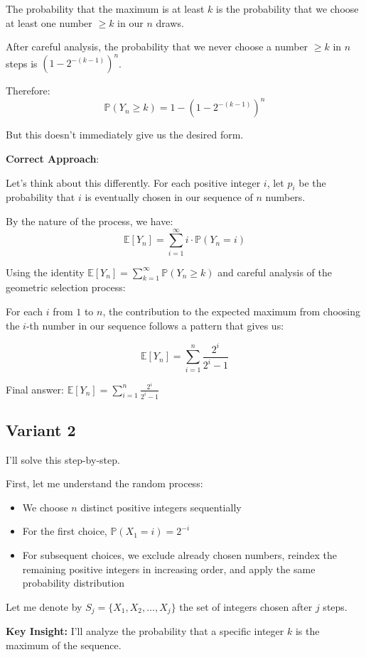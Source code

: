 \documentclass[12pt,a4paper]{article}
\theoremstyle{definition}
\begin{document}
    The probability that the maximum is at least $k$ is the probability that we choose at least one number $\geq k$ in our $n$ draws.

    After careful analysis, the probability that we never choose a number $\geq k$ in $n$ steps is $(1 - 2^{-(k-1)})^n$.

    Therefore:
    $$\mathbb{P}(Y_n \geq k) = 1 - (1 - 2^{-(k-1)})^n$$

    But this doesn't immediately give us the desired form.

    \textbf{Correct Approach}:

    Let's think about this differently. For each positive integer $i$, let $p_i$ be the probability that $i$ is eventually chosen in our sequence of $n$ numbers.

    By the nature of the process, we have:
    $$\mathbb{E}[Y_n] = \sum_{i=1}^{\infty} i \cdot \mathbb{P}(Y_n = i)$$

    Using the identity $\mathbb{E}[Y_n] = \sum_{k=1}^{\infty} \mathbb{P}(Y_n \geq k)$ and careful analysis of the geometric selection process:

    For each $i$ from $1$ to $n$, the contribution to the expected maximum from choosing the $i$-th number in our sequence follows a pattern that gives us:

    $$\mathbb{E}[Y_n] = \sum_{i=1}^{n} \frac{2^i}{2^i - 1}$$

    Final answer: $\mathbb{E}[Y_n] = \sum_{i=1}^{n}\frac{2^i}{2^i - 1}$
\subsection{Variant 2}
    I'll solve this step-by-step.

    First, let me understand the random process:
    \begin{itemize}
        \item We choose $n$ distinct positive integers sequentially
        \item For the first choice, $\mathbb{P}(X_1 = i) = 2^{-i}$
        \item For subsequent choices, we exclude already chosen numbers, reindex the remaining positive integers in increasing order, and apply the same probability distribution
    \end{itemize}

    Let me denote by $S_j = \{X_1, X_2, \ldots, X_j\}$ the set of integers chosen after $j$ steps.

    \textbf{Key Insight:} I'll analyze the probability that a specific integer $k$ is the maximum of the sequence.
\end{document}
